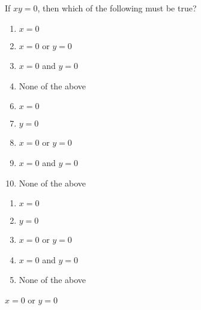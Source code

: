 



 If $xy=0$, then which of the following must be true?


\ifsat
	\begin{enumerate}[label=\Alph*)]
		\item   $x=0$
		\item  $x=0$ or $y=0$%
		\item  $x=0$ and $y=0$
		\item  None of the above
	\end{enumerate}
\else
\fi

\ifacteven
	\begin{enumerate}[label=\textbf{\Alph*.},itemsep=\fill,align=left]
		\setcounter{enumii}{5}
		\item   $x=0$
		\item  $y=0$
		\item  $x=0$ or $y=0$%
		\addtocounter{enumii}{1}
		\item  $x=0$ and $y=0$
		\item  None of the above
	\end{enumerate}
\else
\fi

\ifactodd
	\begin{enumerate}[label=\textbf{\Alph*.},itemsep=\fill,align=left]
		\item   $x=0$
		\item  $y=0$
		\item  $x=0$ or $y=0$%
		\item  $x=0$ and $y=0$
		\item  None of the above
	\end{enumerate}
\else
\fi

\ifgridin
  $x=0$ or $y=0$%
		
\else
\fi

